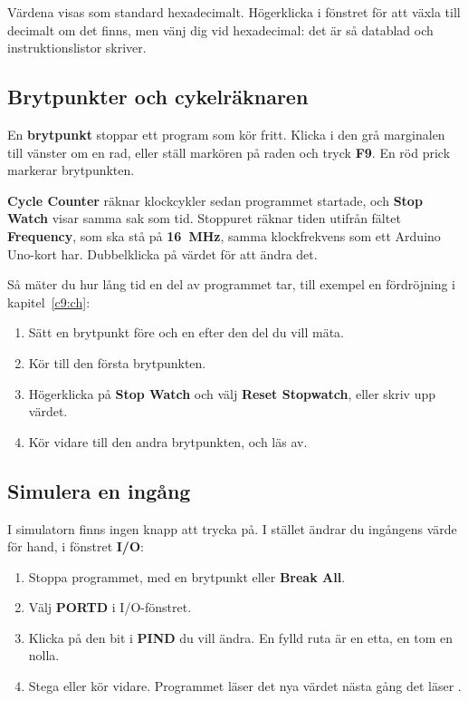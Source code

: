 Värdena visas som standard hexadecimalt. Högerklicka i fönstret för att växla till decimalt om det
finns, men vänj dig vid hexadecimal: det är så datablad och instruktionslistor skriver.

\subsection{Brytpunkter och cykelräknaren}
\label{studio:4-4}
En \textbf{brytpunkt} stoppar ett program som kör fritt. Klicka i den grå marginalen till vänster
om en rad, eller ställ markören på raden och tryck \textbf{F9}. En röd prick markerar brytpunkten.

\textbf{Cycle Counter} räknar klockcykler sedan programmet startade, och \textbf{Stop Watch} visar
samma sak som tid. Stoppuret räknar tiden utifrån fältet \textbf{Frequency}, som ska stå på
\textbf{16~MHz}, samma klockfrekvens som ett Arduino Uno-kort har. Dubbelklicka på värdet för att
ändra det.

Så mäter du hur lång tid en del av programmet tar, till exempel en fördröjning i
kapitel~\ref{c9:ch}:
\begin{enumerate}
  \item Sätt en brytpunkt före och en efter den del du vill mäta.
  \item Kör till den första brytpunkten.
  \item Högerklicka på \textbf{Stop Watch} och välj \textbf{Reset Stopwatch}, eller skriv upp
    värdet.
  \item Kör vidare till den andra brytpunkten, och läs av.
\end{enumerate}

\subsection{Simulera en ingång}
\label{studio:4-5}
I simulatorn finns ingen knapp att trycka på. I stället ändrar du ingångens värde för hand, i
fönstret \textbf{I/O}:
\begin{enumerate}
  \item Stoppa programmet, med en brytpunkt eller \textbf{Break All}.
  \item Välj \textbf{PORTD} i I/O-fönstret.
  \item Klicka på den bit i \textbf{PIND} du vill ändra. En fylld ruta är en etta, en tom en nolla.
  \item Stega eller kör vidare. Programmet läser det nya värdet nästa gång det läser .
\end{enumerate}

